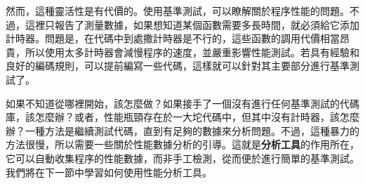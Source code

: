然而，這種靈活性是有代價的。使用基準測試，可以瞭解關於程序性能的問題。不過，這裡只報告了測量數據，如果想知道某個函數需要多長時間，就必須給它添加計時器。問題是，在代碼中到處撒計時器是不行的，這些函數的調用代價相當昂貴，所以使用太多計時器會減慢程序的速度，並嚴重影響性能測試。若具有經驗和良好的編碼規則，可以提前編寫一些代碼，這樣就可以針對其主要部分進行基準測試了。

如果不知道從哪裡開始，該怎麼做？如果接手了一個沒有進行任何基準測試的代碼庫，該怎麼辦？或者，性能瓶頸存在於一大坨代碼中，但其中沒有計時器，該怎麼辦？一種方法是繼續測試代碼，直到有足夠的數據來分析問題。不過，這種暴力的方法很慢，所以需要一些關於性能數據分析的引導。這就是\textbf{分析工具}的作用所在，它可以自動收集程序的性能數據，而非手工檢測，從而便於進行簡單的基準測試。我們將在下一節中學習如何使用性能分析工具。






